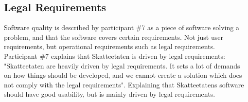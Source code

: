 


\subsection{Legal Requirements} \label{sec:legal}
Software quality is described by participant \#7 as a piece of software solving a problem, and that the software covers certain requirements. Not just user requirements, but operational requirements such as legal requirements. Participant \#7 explains that Skatteetaten is driven by legal requirements: "Skatteetaten are heavily driven by legal requirements. It sets a lot of demands on how things should be developed, and we cannot create a solution which does not comply with the legal requirements". Explaining that Skatteetatens software should have good usability, but is mainly driven by legal requirements.


